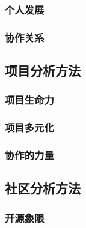 \subsubsection{个人发展}

\subsubsection{协作关系}

\subsection{项目分析方法}
\subsubsection{项目生命力}

\subsubsection{项目多元化}

\subsubsection{协作的力量}

\subsection{社区分析方法}
\subsubsection{开源象限}

